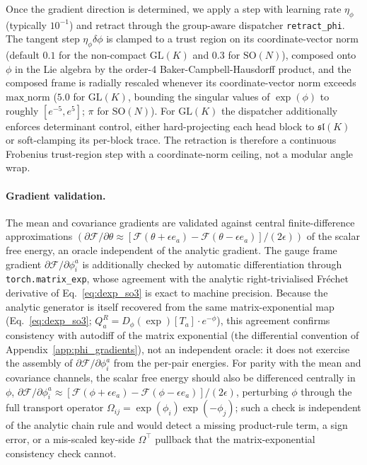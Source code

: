 \documentclass[twoside,11pt]{article}
\begin{document}
Once the gradient direction is determined, we apply a step with learning rate $\eta_\phi$ (typically $10^{-1}$) and retract through the group-aware dispatcher \texttt{retract\_phi}. The tangent step $\eta_\phi \delta\phi$ is clamped to a trust region on its coordinate-vector norm (default $0.1$ for the non-compact $\mathrm{GL}(K)$ and $0.3$ for $\mathrm{SO}(N)$), composed onto $\phi$ in the Lie algebra by the order-4 Baker-Campbell-Hausdorff product, and the composed frame is radially rescaled whenever its coordinate-vector norm exceeds $\mathrm{max\_norm}$ ($5.0$ for $\mathrm{GL}(K)$, bounding the singular values of $\exp(\phi)$ to roughly $[e^{-5}, e^{5}]$; $\pi$ for $\mathrm{SO}(N)$). For $\mathrm{GL}(K)$ the dispatcher additionally enforces determinant control, either hard-projecting each head block to $\mathfrak{sl}(K)$ or soft-clamping its per-block trace. The retraction is therefore a continuous Frobenius trust-region step with a coordinate-norm ceiling, not a modular angle wrap.


\paragraph{Gradient validation.} The mean and covariance gradients are validated against central finite-difference approximations $(\partial \mathcal{F}/\partial \theta \approx [\mathcal{F}(\theta + \epsilon e_a) - \mathcal{F}(\theta - \epsilon e_a)]/(2\epsilon))$ of the scalar free energy, an oracle independent of the analytic gradient. The gauge frame gradient $\partial\mathcal{F}/\partial\phi_i^a$ is additionally checked by automatic differentiation through \texttt{torch.matrix\_exp}, whose agreement with the analytic right-trivialised Fr\'echet derivative of Eq.~\eqref{eq:dexp_so3} is exact to machine precision. Because the analytic generator is itself recovered from the same matrix-exponential map (Eq.~\eqref{eq:dexp_so3}; $Q_a^R = D_\phi(\exp)[T_a]\cdot e^{-\phi}$), this agreement confirms consistency with autodiff of the matrix exponential (the differential convention of Appendix~\ref{app:phi_gradients}), not an independent oracle: it does not exercise the assembly of $\partial\mathcal{F}/\partial\phi_i^a$ from the per-pair energies. For parity with the mean and covariance channels, the scalar free energy should also be differenced centrally in $\phi$, $\partial\mathcal{F}/\partial\phi_i^a \approx [\mathcal{F}(\phi + \epsilon e_a) - \mathcal{F}(\phi - \epsilon e_a)]/(2\epsilon)$, perturbing $\phi$ through the full transport operator $\Omega_{ij} = \exp(\phi_i)\exp(-\phi_j)$; such a check is independent of the analytic chain rule and would detect a missing product-rule term, a sign error, or a mis-scaled key-side $\Omega^\top$ pullback that the matrix-exponential consistency check cannot.
\end{document}
